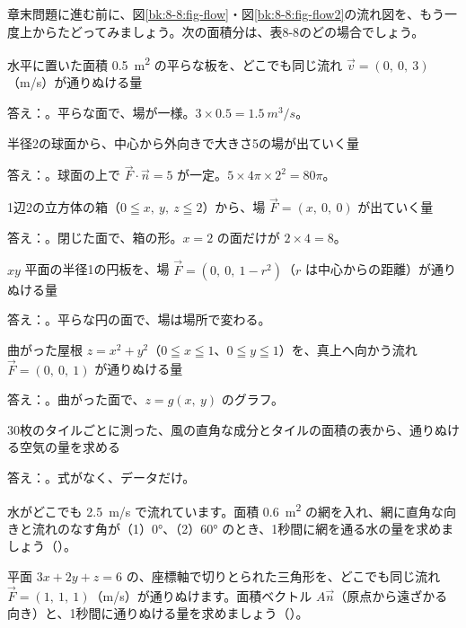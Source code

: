 章末問題に進む前に、図\ref{bk:8-8:fig-flow}・図\ref{bk:8-8:fig-flow2}の流れ図を、もう一度上からたどってみましょう。次の面積分は、表8-8のどの場合でしょう。
\begin{enumerate}[label={\bkcircled[\bkTT]{\arabic*}}, leftmargin=2.4\zw, itemsep=3pt, topsep=2pt]
\item 水平に置いた面積 \qty{0.5}{m^2} の平らな板を、どこでも同じ流れ $\vec v=(0,\ 0,\ 3)$（m/s）が通りぬける量\par\nobreak\noindent 答え：。平らな面で、場が一様。$3\times0.5=\qty{1.5}{m^3/s}$。
\item 半径2の球面から、中心から外向きで大きさ5の場が出ていく量\par\nobreak\noindent 答え：。球面の上で $\vec F\cdot\vec n=5$ が一定。$5\times4\pi\times2^2=80\pi$。
\item 1辺2の立方体の箱（$0\leqq x,\ y,\ z\leqq2$）から、場 $\vec F=(x,\ 0,\ 0)$ が出ていく量\par\nobreak\noindent 答え：。閉じた面で、箱の形。$x=2$ の面だけが $2\times4=8$。
\item $xy$ 平面の半径1の円板を、場 $\vec F=(0,\ 0,\ 1-r^2)$（$r$ は中心からの距離）が通りぬける量\par\nobreak\noindent 答え：。平らな円の面で、場は場所で変わる。
\item 曲がった屋根 $z=x^2+y^2$（$0\leqq x\leqq1$、$0\leqq y\leqq1$）を、真上へ向かう流れ $\vec F=(0,\ 0,\ 1)$ が通りぬける量\par\nobreak\noindent 答え：。曲がった面で、$z=g(x,\ y)$ のグラフ。
\item 30枚のタイルごとに測った、風の直角な成分とタイルの面積の表から、通りぬける空気の量を求める\par\nobreak\noindent 答え：。式がなく、データだけ。
\end{enumerate}

\bkendproblems
{}

\bkproblem 水がどこでも \qty{2.5}{m/s} で流れています。面積 \qty{0.6}{m^2} の網を入れ、網に直角な向きと流れのなす角が（1）\ang{0}、（2）\ang{60} のとき、1秒間に網を通る水の量を求めましょう\mbox{（）}。

\bkproblem 平面 $3x+2y+z=6$ の、座標軸で切りとられた三角形を、どこでも同じ流れ $\vec F=(1,\ 1,\ 1)$（m/s）が通りぬけます。面積ベクトル $A\vec n$（原点から遠ざかる向き）と、1秒間に通りぬける量を求めましょう\mbox{（）}。

